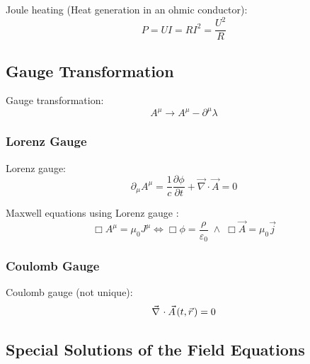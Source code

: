 			\noindent
			Joule heating (Heat generation in an ohmic conductor):
			\begin{equation}
				P = UI = RI^2 = \frac{U^2}{R}
			\end{equation}

	\subsection{Gauge Transformation}
		\noindent
		Gauge transformation:
		\begin{equation}
			A^\mu \to A^\mu-\partial^\mu \lambda
		\end{equation}

		\subsubsection{Lorenz Gauge}
			\noindent
			Lorenz gauge:
			\begin{equation}
				\partial_\mu A^\mu = \frac{1}{c}\frac{\partial \phi}{\partial t} + \vec{\nabla}\cdot\vec{A} = 0
			\end{equation}

			\noindent
			Maxwell equations using Lorenz gauge :
			\begin{equation}
				\Box A^\mu = \mu_0 J^\mu \iff
				\Box \phi = \dfrac{\rho}{\varepsilon_0} \;\wedge\;
				\Box \vec{A} = \mu_0 \vec{j}
			\end{equation}

		\subsubsection{Coulomb Gauge }
			\noindent
			Coulomb gauge (not unique):
			\begin{equation}
				\Nabla\cdot\vec{A}(t,\vec{r})=0
			\end{equation}

	\subsection{Special Solutions of the Field Equations}
